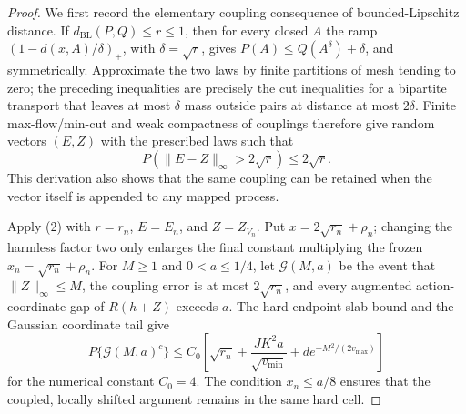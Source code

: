 \documentclass{article}
\begin{document}
\begin{proof}
We first record the elementary coupling consequence of bounded-Lipschitz distance.  If \(d_{\mathrm{BL}}(P,Q)\le r\le1\), then for every closed \(A\) the ramp \((1-d(x,A)/\delta)_+\), with \(\delta=\sqrt r\), gives \(P(A)\le Q(A^\delta)+\delta\), and symmetrically.  Approximate the two laws by finite partitions of mesh tending to zero; the preceding inequalities are precisely the cut inequalities for a bipartite transport that leaves at most \(\delta\) mass outside pairs at distance at most \(2\delta\).  Finite max-flow/min-cut and weak compactness of couplings therefore give random vectors \((E,Z)\) with the prescribed laws such that
\[
 P(\|E-Z\|_\infty>2\sqrt r)\le2\sqrt r.                \tag{2}
\]
This derivation also shows that the same coupling can be retained when the vector itself is appended to any mapped process.

Apply (2) with \(r=r_n\), \(E=E_n\), and \(Z=Z_{V_n}\).  Put \(x=2\sqrt{r_n}+\rho_n\); changing the harmless factor two only enlarges the final constant multiplying the frozen \(x_n=\sqrt{r_n}+\rho_n\).  For \(M\ge1\) and \(0<a\le1/4\), let \(\mathcal G(M,a)\) be the event that \(\|Z\|_\infty\le M\), the coupling error is at most \(2\sqrt{r_n}\), and every augmented action-coordinate gap of \(R(h+Z)\) exceeds \(a\).  The hard-endpoint slab bound and the Gaussian coordinate tail give
\[
 P\{\mathcal G(M,a)^c\}
 \le C_0\left[\sqrt{r_n}+\frac{JK^2a}{\sqrt{v_{\min}}}
 +d e^{-M^2/(2v_{\max})}\right]                       \tag{3}
\]
for the numerical constant \(C_0=4\).  The condition \(x_n\le a/8\) ensures that the coupled, locally shifted argument remains in the same hard cell.


\end{proof}
\end{document}
